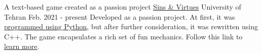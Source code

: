 \begin{cventries}
  \cventry
    {A text-based game created as a passion project} %
    {\href{https://github.com/kamali-sina/Sins-Virtues-Legacy}{Sins \& Virtues}} %
    {University of Tehran} %
    {Feb. 2021 - present} %
    {
      Developed as a passion project. At first, it was \href{https://github.com/kamali-sina/Sins-Virtues}{programmed using Python}, but after further consideration, it was rewritten using C++. The game encapsulates a rich set of fun mechanics. Follow this link to \href{https://github.com/kamali-sina/Sins-Virtues-Legacy/blob/main/Tutorial.md}{learn more}.
      }

\end{cventries}
